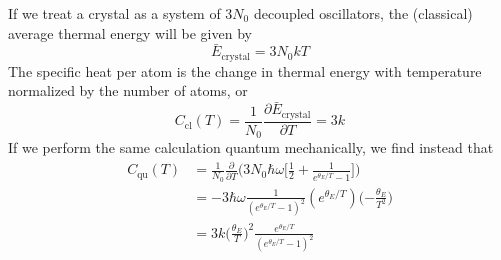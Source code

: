 \documentclass[../principles-of-quantum-mechanics.tex]{subfiles}
\begin{document}
\begin{questions}
\begin{solution}
			If we treat a crystal as a system of $3N_0$ decoupled oscillators, the (classical) average thermal energy will be given by
			$$\bar{E}_{\text{crystal}} = 3N_0kT$$
			The specific heat per atom is the change in thermal energy with temperature normalized by the number of atoms, or
			$$C_{\text{cl}}(T) = \frac{1}{N_0}\frac{\partial \bar{E}_{\text{crystal}}}{\partial T} = 3k$$
			If we perform the same calculation quantum mechanically, we find instead that
			\begin{align*}
				C_{\text{qu}}(T) &= \frac{1}{N_0}\frac{\partial}{\partial T}\Big(3N_0\hbar\omega\Big[\frac{1}{2} + \frac{1}{e^{\theta_E/T} - 1}\Big]\Big) \\
				&= -3\hbar\omega\frac{1}{(e^{\theta_E/T} - 1)^2}(e^{\theta_E/T})\Big({-\frac{\theta_E}{T^2}}\Big) \\
				&= 3k\Big(\frac{\theta_E}{T}\Big)^2\frac{e^{\theta_E/T}}{(e^{\theta_E/T} - 1)^2}
			\end{align*}
		\end{solution}
	\end{questions}
\end{document}
